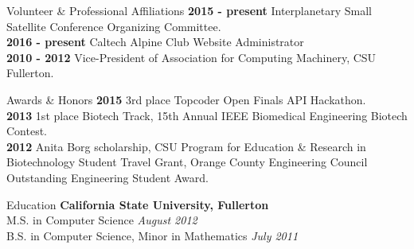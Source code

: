 \documentclass{resume} %
\begin{document}
\begin{rSection}{Volunteer \& Professional Affiliations}
{\bf 2015 - present } Interplanetary Small Satellite Conference Organizing Committee. \\
{\bf 2016 - present } Caltech Alpine Club Website Administrator \\
{\bf 2010 - 2012} Vice-President of Association for Computing Machinery, CSU Fullerton. 
\end{rSection}




\begin{rSection}{Awards \& Honors}
{\bf 2015}  3rd place Topcoder Open Finals API Hackathon. \\
{\bf 2013}  1st place Biotech Track, 15th Annual IEEE Biomedical Engineering Biotech Contest. \\
{\bf 2012} Anita Borg scholarship, CSU Program for Education \& Research in Biotechnology Student Travel Grant, Orange County Engineering Council Outstanding Engineering Student Award. \\
\end{rSection}


\begin{rSection}{Education}
{\bf California State University, Fullerton}  \\ 
M.S. in Computer Science \hfill {\em August 2012}\\
B.S. in Computer Science, Minor in Mathematics  \hfill {\em July 2011}\\
\end{rSection}






\end{document}
